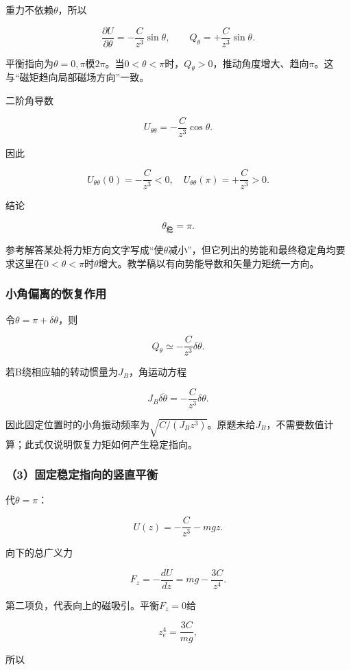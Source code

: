 \documentclass[12pt,a4paper,fontset=fandol]{ctexart}
\begin{document}
重力不依赖\(\theta\)，所以

\[
\frac{\partial U}{\partial\theta}
=-\frac C{z^3}\sin\theta,
\qquad
Q_\theta=+\frac C{z^3}\sin\theta.
\]

平衡指向为\(\theta=0,\pi\)模\(2\pi\)。当\(0<\theta<\pi\)时，\(Q_\theta>0\)，推动角度增大、趋向\(\pi\)。这与``磁矩趋向局部磁场方向''一致。

二阶角导数

\[
U_{\theta\theta}=-\frac C{z^3}\cos\theta.
\]

因此

\[
U_{\theta\theta}(0)=-\frac C{z^3}<0,
\quad
U_{\theta\theta}(\pi)=+\frac C{z^3}>0.
\]

结论

\[
\boxed{\theta_{\text{稳}}=\pi}.
\]

参考解答某处将力矩方向文字写成``使\(\theta\)减小''，但它列出的势能和最终稳定角均要求这里在\(0<\theta<\pi\)时\(\theta\)增大。教学稿以有向势能导数和矢量力矩统一方向。

\subsubsection{小角偏离的恢复作用}\label{ux5c0fux89d2ux504fux79bbux7684ux6062ux590dux4f5cux7528}

令\(\theta=\pi+\delta\theta\)，则

\[
Q_\theta\simeq-\frac C{z^3}\delta\theta.
\]

若B绕相应轴的转动惯量为\(J_B\)，角运动方程

\[
J_B\delta\ddot\theta=-\frac C{z^3}\delta\theta.
\]

因此固定位置时的小角振动频率为\(\sqrt{C/(J_Bz^3)}\)。原题未给\(J_B\)，不需要数值计算；此式仅说明恢复力矩如何产生稳定指向。

\subsubsection{（3）固定稳定指向的竖直平衡}\label{ux56faux5b9aux7a33ux5b9aux6307ux5411ux7684ux7ad6ux76f4ux5e73ux8861}

代\(\theta=\pi\)：

\[
U(z)=-\frac C{z^3}-mgz.
\]

向下的总广义力

\[
F_z=-\frac{dU}{dz}
=mg-\frac{3C}{z^4}.
\]

第二项负，代表向上的磁吸引。平衡\(F_z=0\)给

\[
z_e^4=\frac{3C}{mg},
\]

所以
\end{document}
